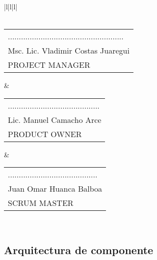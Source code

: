 \begin{minipage}[!htb]{\hsize}
\begin{tabular}{|l|l|l|}
 \\ \hline
{} \\ \hline
\begin{tabular}[c]{@{}l@{}}.....................................................\\ Msc. Lic. Vladimir Costas Juaregui\\ PROJECT MANAGER\end{tabular} & \begin{tabular}[c]{@{}l@{}}..........................................\\ Lic. Manuel Camacho Arce\\ PRODUCT OWNER\end{tabular} & \begin{tabular}[c]{@{}l@{}}.........................................\\ Juan Omar Huanca Balboa\\ SCRUM MASTER\end{tabular} \\ \hline
\end{tabular}
\label{Tarjeta historia de usuario 03}
\end{minipage}

\subsection{Arquitectura de componente}

